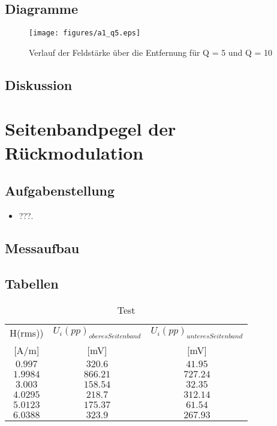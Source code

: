 \documentclass[12pt,a4paper,ngerman]{article}
\begin{document}
\pagebreak
\subsection{Diagramme}
\begin{figure}[H]
\centering
\texttt{[image: figures/a1\_q5.eps]} 
\caption{Verlauf der Feldstärke über die Entfernung für Q = 5 und Q = 10}
\label{fig:1_q5}
\end{figure}

\subsection{Diskussion}

\section{Seitenbandpegel der Rückmodulation}
\subsection{Aufgabenstellung}

\begin{itemize}
\item???.
\end{itemize}


\subsection{Messaufbau}

\subsection{Tabellen}
\begin{table}
\begin{center}
\begin{tabular}{ |c|c|c| }
  \hline

    H(rms)) & $U_i(pp)_{oberes Seitenband}$ & $U_i(pp)_{unteres Seitenband}$\\

	[A/m] & [mV] & [mV] \\
  \hline
  $0.997$ & $320.6$ & $41.95$\\
  \hline
  $1.9984$ & $866.21$ & $727.24$ \\
  \hline
  $3.003$ & $158.54$ & $32.35$\\
  \hline
  $4.0295$ & $218.7$ & $312.14$\\
    \hline
  $5.0123$ & $175.37$ & $61.54$\\
    \hline
  $6.0388$ & $323.9$ & $267.93$ \\
    \hline 
\end{tabular}
\caption{Test}
\end{center}
\end{table} 
\end{document}
